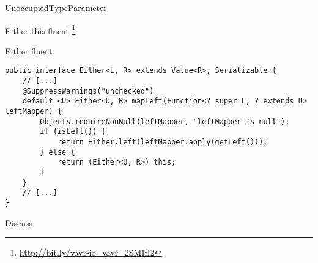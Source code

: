 \begin{pattern}{UnoccupiedTypeParameter}

\instances{}

Either this fluent \api{}
\footnote{\url{http://bit.ly/vavr-io_vavr_2SMIfI2}}

\begin{listing}[H]
\caption{Either fluent \api{}}
\begin{verbatim}
public interface Either<L, R> extends Value<R>, Serializable {
    // [...]
    @SuppressWarnings("unchecked")
    default <U> Either<U, R> mapLeft(Function<? super L, ? extends U> leftMapper) {
        Objects.requireNonNull(leftMapper, "leftMapper is null");
        if (isLeft()) {
            return Either.left(leftMapper.apply(getLeft()));
        } else {
            return (Either<U, R>) this;
        }
    }
    // [...]
}
\end{verbatim}
\end{listing}




\detection{}

\discussion{}

Discuss

\related{}

\end{pattern}